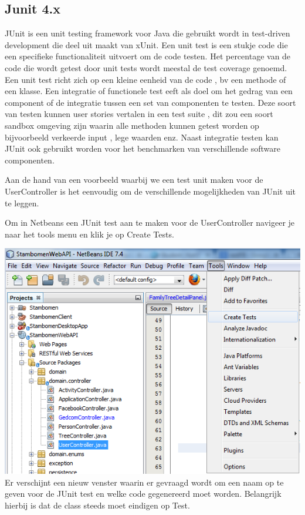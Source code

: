 \documentclass[pdftex,a4paper,12pt,twoside]{report}
\begin{document}
\subsection{Junit 4.x}
JUnit is een unit testing framework voor Java die gebruikt wordt in test-driven development die deel uit maakt van xUnit.
Een unit test is een stukje code die een specifieke functionaliteit uitvoert om de code testen. Het percentage van de code die wordt getest door unit tests wordt meestal de test coverage genoemd.
Een unit test richt zich op een kleine eenheid van de code , bv een methode of een klasse.
Een integratie of functionele test eeft als doel om het gedrag van een component of de integratie tussen een set van componenten te testen.
Deze soort van testen kunnen user stories vertalen in een test suite , dit zou een soort sandbox omgeving zijn waarin alle methoden kunnen getest worden op bijvoorbeeld verkeerde input , lege waarden enz.
Naast integratie testen kan JUnit ook gebruikt worden voor het benchmarken van verschillende software componenten.

Aan de hand van een voorbeeld waarbij we een test unit maken voor de UserController is het eenvoudig om de verschillende mogelijkheden van JUnit uit te leggen.

Om in Netbeans een JUnit test aan te maken voor de UserController navigeer je naar het tools menu en klik je op Create Tests.

\includegraphics{images/netbeansjunit.png}\\

Er verschijnt een nieuw venster waarin er gevraagd wordt om een naam op te geven voor de JUnit test en welke code gegenereerd moet worden. Belangrijk hierbij is dat de class steeds moet eindigen op Test.
\end{document}
